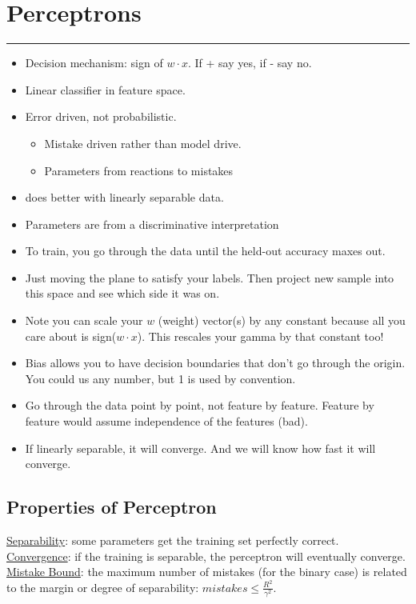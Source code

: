 \section{Perceptrons}
\smallskip \hrule height 2pt \smallskip

\begin{itemize}
	\item Decision mechanism: sign of $w \cdot x$.  If + say yes, if - say no.  %
	\item Linear classifier in feature space.
	\item Error driven, not probabilistic. \hfill \\
		\begin{itemize}
			\item Mistake driven rather than model drive. \hfill \\
			\item Parameters from reactions to mistakes  %
		\end{itemize}
	\item does better with linearly separable data. 
	\item Parameters are from a discriminative interpretation %
	\item To train, you go through the data until the held-out accuracy maxes out. %
	\item  Just moving the plane to satisfy your labels.
			Then project new sample into this space and see which side it was on.  %
	\item Note you can scale your $w$ (weight) vector(s) by any constant because all you care about is sign($w \cdot x$).
		This rescales your gamma by that constant too! \hfill \\
	\item Bias allows you to have decision boundaries that don't go through the origin.  
		You could us any number, but 1 is used by convention. 
	\item Go through the data point by point, not feature by feature.
		Feature by feature would assume independence of the features (bad).  %
	\item If linearly separable, it will converge.  And we will know how fast it will converge.  %
\end{itemize}

\subsection{Properties of Perceptron}
\underline{Separability}: some parameters get the training set perfectly correct. \hfill \\
\underline{Convergence}: if the training is separable, the perceptron will eventually converge. \hfill \\
\underline{Mistake Bound}: the maximum number of mistakes (for the binary case) is related to the 
margin or degree of separability: $mistakes \leq \frac{R^2}{\gamma^2}$. \hfill \\
\hfill \\  \hfill \\

